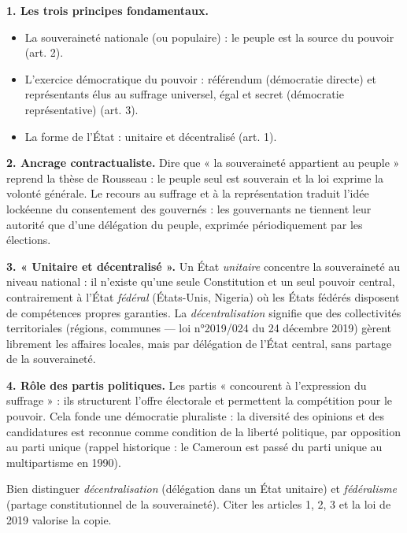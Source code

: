 \documentclass[11pt]{article}
\newcommand{\cle}[1]{{\popxbold\color{popdark}#1}}
\begin{document}
\begin{corrige}
\textbf{1. Les trois principes fondamentaux.}
\begin{itemize}
    \item La \cle{souveraineté nationale} (ou populaire) : le peuple est la source du pouvoir (art. 2).
    \item L'exercice \cle{démocratique} du pouvoir : référendum (démocratie directe) et représentants élus au suffrage universel, égal et secret (démocratie représentative) (art. 3).
    \item La forme de l'État : \cle{unitaire et décentralisé} (art. 1).
\end{itemize}

\textbf{2. Ancrage contractualiste.} Dire que « la souveraineté appartient au peuple » reprend la thèse de Rousseau : le peuple seul est souverain et la loi exprime la volonté générale. Le recours au suffrage et à la représentation traduit l'idée lockéenne du consentement des gouvernés : les gouvernants ne tiennent leur autorité que d'une délégation du peuple, exprimée périodiquement par les élections.

\textbf{3. « Unitaire et décentralisé ».} Un État \emph{unitaire} concentre la souveraineté au niveau national : il n'existe qu'une seule Constitution et un seul pouvoir central, contrairement à l'État \emph{fédéral} (États-Unis, Nigeria) où les États fédérés disposent de compétences propres garanties. La \emph{décentralisation} signifie que des collectivités territoriales (régions, communes — loi n°2019/024 du 24 décembre 2019) gèrent librement les affaires locales, mais par délégation de l'État central, sans partage de la souveraineté.

\textbf{4. Rôle des partis politiques.} Les partis « concourent à l'expression du suffrage » : ils structurent l'offre électorale et permettent la compétition pour le pouvoir. Cela fonde une \cle{démocratie pluraliste} : la diversité des opinions et des candidatures est reconnue comme condition de la liberté politique, par opposition au parti unique (rappel historique : le Cameroun est passé du parti unique au multipartisme en 1990).
\end{corrige}

\begin{attention}
Bien distinguer \emph{décentralisation} (délégation dans un État unitaire) et \emph{fédéralisme} (partage constitutionnel de la souveraineté). Citer les articles 1, 2, 3 et la loi de 2019 valorise la copie.
\end{attention}
\end{document}
